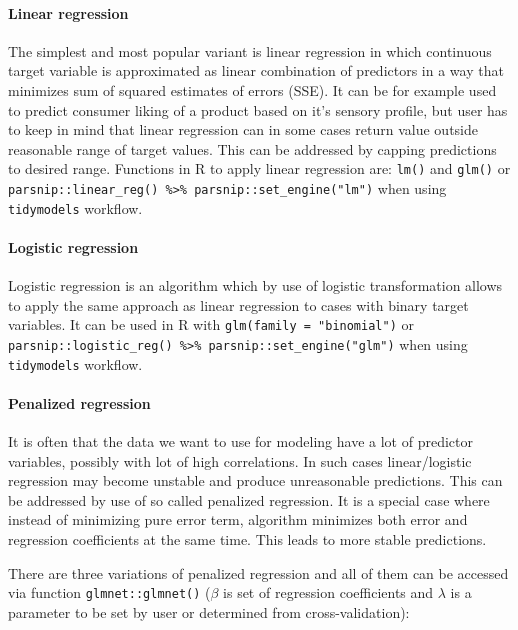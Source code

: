 \documentclass[
]{book}
\begin{document}
\hypertarget{linear-regression}{%
\paragraph{Linear regression}\label{linear-regression}}

The simplest and most popular variant is linear regression in which continuous
target variable is approximated as linear combination of predictors in a way that
minimizes sum of squared estimates of errors (SSE). It can be for example used to
predict consumer liking of a product based on it's sensory profile, but user has
to keep in mind that linear regression can in some cases return value outside
reasonable range of target values. This can be addressed by capping predictions
to desired range. Functions in R to apply linear regression are: \texttt{lm()} and \texttt{glm()}
or \texttt{parsnip::linear\_reg()\ \%\textgreater{}\%\ parsnip::set\_engine("lm")} when using \texttt{tidymodels} workflow.

\hypertarget{logistic-regression}{%
\paragraph{Logistic regression}\label{logistic-regression}}

Logistic regression is an algorithm which by use of logistic transformation allows
to apply the same approach as linear regression to cases with binary target variables.
It can be used in R with \texttt{glm(family\ =\ "binomial")} or
\texttt{parsnip::logistic\_reg()\ \%\textgreater{}\%\ parsnip::set\_engine("glm")} when using \texttt{tidymodels} workflow.

\hypertarget{penalized-regression}{%
\paragraph{Penalized regression}\label{penalized-regression}}

It is often that the data we want to use for modeling have a lot of predictor
variables, possibly with lot of high correlations. In such cases linear/logistic
regression may become unstable and produce unreasonable predictions. This can be
addressed by use of so called penalized regression. It is a special case where
instead of minimizing pure error term, algorithm minimizes both error and regression
coefficients at the same time. This leads to more stable predictions.

There are three variations of penalized regression and all of them can be accessed
via function \texttt{glmnet::glmnet()} (\(\beta\) is set of regression coefficients and
\(\lambda\) is a parameter to be set by user or determined from cross-validation):
\end{document}
